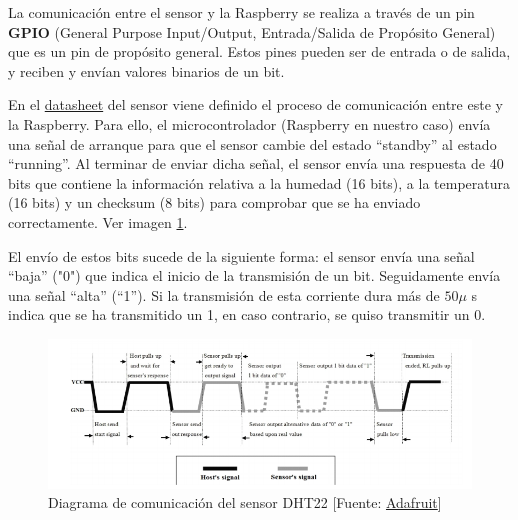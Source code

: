 La comunicación entre el sensor y la Raspberry se realiza a través de un pin \textbf{GPIO} (General Purpose Input/Output, Entrada/Salida de Propósito General) que es un pin de propósito general. Estos pines pueden ser de entrada o de salida, y reciben y envían valores binarios de un bit.

En el \href{https://cdn-shop.adafruit.com/datasheets/Digital+humidity+and+temperature+sensor+AM2302.pdf}{datasheet} del sensor viene definido el proceso de comunicación entre este y la Raspberry. Para ello, el microcontrolador (Raspberry en nuestro caso) envía una señal de arranque para que el sensor cambie del estado ``standby'' al estado ``running''. Al terminar de enviar dicha señal, el sensor envía una respuesta de 40 bits que contiene la información relativa a la humedad (16 bits), a la temperatura (16 bits) y un checksum (8 bits) para comprobar que se ha enviado correctamente. Ver imagen \ref{DHT22comunication}.

El envío de estos bits sucede de la siguiente forma: el sensor envía una señal ``baja'' ("0") que indica el inicio de la transmisión de un bit. Seguidamente envía una señal ``alta'' (``1''). Si la transmisión de esta corriente dura más de $ 50 \mu $ s indica que se ha transmitido un 1, en caso contrario, se quiso transmitir un 0.

\begin{figure}[htb]
	
	\begin{center}
		\includegraphics[width=15cm]{figures/DTH22comunicationdiagram.png}
		\caption{Diagrama de comunicación del sensor DHT22 [Fuente: \href{https://cdn-shop.adafruit.com/datasheets/Digital+humidity+and+temperature+sensor+AM2302.pdf}{Adafruit}]}
	\end{center}
	
	\label{DHT22comunication}
\end{figure} 

